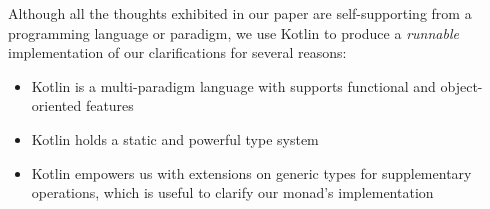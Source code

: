 Although all the thoughts exhibited in our paper are self-supporting from a programming language or paradigm, we use Kotlin to produce a \textit{runnable} implementation of our clarifications for several reasons:

\begin{itemize}
    \item Kotlin is a multi-paradigm language with supports functional and object-oriented features
    \item Kotlin holds a static and powerful type system
    \item Kotlin empowers us with extensions on generic types for supplementary operations, which is useful to clarify our monad's implementation
\end{itemize}
